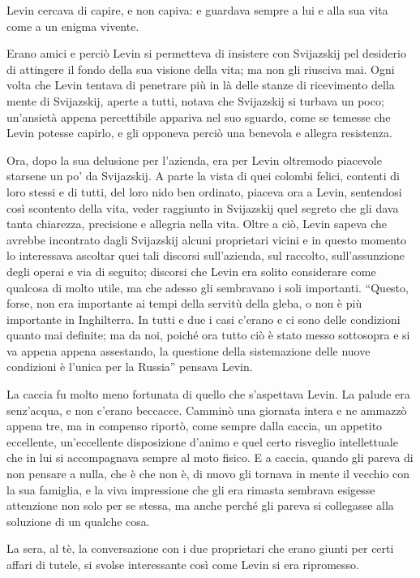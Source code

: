 Levin cercava di capire, e non capiva: e guardava sempre a lui e alla sua vita come a un enigma vivente. 

Erano amici e perciò Levin si permetteva di insistere con Svijazskij pel desiderio di attingere il fondo della sua visione della vita; ma non gli riusciva mai. Ogni volta che Levin tentava di penetrare più in là delle stanze di ricevimento della mente di Svijazskij, aperte a tutti, notava che Svijazskij si turbava un poco; un'ansietà appena percettibile appariva nel suo sguardo, come se temesse che Levin potesse capirlo, e gli opponeva perciò una benevola e allegra resistenza. 

Ora, dopo la sua delusione per l'azienda, era per Levin oltremodo piacevole starsene un po' da Svijazskij. A parte la vista di quei colombi felici, contenti di loro stessi e di tutti, del loro nido ben ordinato, piaceva ora a Levin, sentendosi così scontento della vita, veder raggiunto in Svijazskij quel segreto che gli dava tanta chiarezza, precisione e allegria nella vita. Oltre a ciò, Levin sapeva che avrebbe incontrato dagli Svijazskij alcuni proprietari vicini e in questo momento lo interessava ascoltar quei tali discorsi sull'azienda, sul raccolto, sull'assunzione degli operai e via di seguito; discorsi che Levin era solito considerare come qualcosa di molto utile, ma che adesso gli sembravano i soli importanti. ``Questo, forse, non era importante ai tempi della servitù della gleba, o non è più importante in Inghilterra. In tutti e due i casi c'erano e ci sono delle condizioni quanto mai definite; ma da noi, poiché ora tutto ciò è stato messo sottosopra e si va appena appena assestando, la questione della sistemazione delle nuove condizioni è l'unica per la Russia'' pensava Levin. 

La caccia fu molto meno fortunata di quello che s'aspettava Levin. La palude era senz'acqua, e non c'erano beccacce. Camminò una giornata intera e ne ammazzò appena tre, ma in compenso riportò, come sempre dalla caccia, un appetito eccellente, un'eccellente disposizione d'animo e quel certo risveglio intellettuale che in lui si accompagnava sempre al moto fisico. E a caccia, quando gli pareva di non pensare a nulla, che è che non è, di nuovo gli tornava in mente il vecchio con la sua famiglia, e la viva impressione che gli era rimasta sembrava esigesse attenzione non solo per se stessa, ma anche perché gli pareva si collegasse alla soluzione di un qualche cosa. 

La sera, al tè, la conversazione con i due proprietari che erano giunti per certi affari di tutele, si svolse interessante così come Levin si era ripromesso. 

